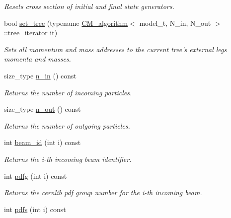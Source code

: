 \begin{DoxyCompactItemize}
\begin{DoxyCompactList}\small\item\em Resets cross section of initial and final state generators. \end{DoxyCompactList}\item 
bool \hyperlink{a00441_af3e00200b661698bf1e36495a816a3b6}{set\-\_\-tree} (typename \hyperlink{a00070}{C\-M\-\_\-algorithm}$<$ model\-\_\-t, N\-\_\-in, N\-\_\-out $>$\-::tree\-\_\-iterator it)
\begin{DoxyCompactList}\small\item\em Sets all momentum and mass addresses to the current tree's external legs momenta and masses. \end{DoxyCompactList}\item 
\hypertarget{a00441_a65d6bc1d66794e4681960e19706d17c3}{size\-\_\-type \hyperlink{a00441_a65d6bc1d66794e4681960e19706d17c3}{n\-\_\-in} () const }\label{a00441_a65d6bc1d66794e4681960e19706d17c3}

\begin{DoxyCompactList}\small\item\em Returns the number of incoming particles. \end{DoxyCompactList}\item 
\hypertarget{a00441_abc07b7563a01931e291a3a99296984ba}{size\-\_\-type \hyperlink{a00441_abc07b7563a01931e291a3a99296984ba}{n\-\_\-out} () const }\label{a00441_abc07b7563a01931e291a3a99296984ba}

\begin{DoxyCompactList}\small\item\em Returns the number of outgoing particles. \end{DoxyCompactList}\item 
\hypertarget{a00441_ae8b9e47a20834f1a3a136e157265b53f}{int \hyperlink{a00441_ae8b9e47a20834f1a3a136e157265b53f}{beam\-\_\-id} (int i) const }\label{a00441_ae8b9e47a20834f1a3a136e157265b53f}

\begin{DoxyCompactList}\small\item\em Returns the i-\/th incoming beam identifier. \end{DoxyCompactList}\item 
\hypertarget{a00441_ab963ccd0bcebc4a23a1c8458f4a12d9b}{int \hyperlink{a00441_ab963ccd0bcebc4a23a1c8458f4a12d9b}{pdfg} (int i) const }\label{a00441_ab963ccd0bcebc4a23a1c8458f4a12d9b}

\begin{DoxyCompactList}\small\item\em Returns the cernlib pdf group number for the i-\/th incoming beam. \end{DoxyCompactList}\item 
\hypertarget{a00441_a0ede4675a8a1b5f5cd579b81b34dfef7}{int \hyperlink{a00441_a0ede4675a8a1b5f5cd579b81b34dfef7}{pdfs} (int i) const }\label{a00441_a0ede4675a8a1b5f5cd579b81b34dfef7}


\end{DoxyCompactItemize}
